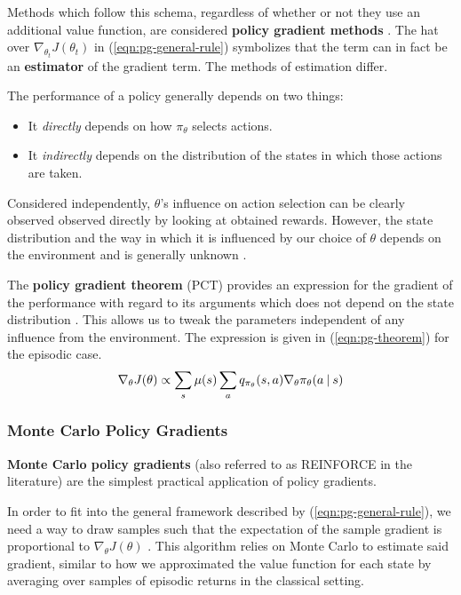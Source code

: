 Methods which follow this schema, regardless of whether or not they use an additional value function, are considered \textbf{policy gradient methods} \cite{rlai}.
The hat over $\nabla_{\theta_{t}} J(\theta_{t})$ in (\ref{eqn:pg-general-rule}) symbolizes that the term can in fact be an \textbf{estimator} of the gradient term. The methods of estimation differ.

The performance of a policy generally depends on two things:
\begin{itemize}
    \item It \emph{directly} depends on how $\pi_{\theta}$ selects actions.
    \item It \emph{indirectly} depends on the distribution of the states in which those actions are taken.
\end{itemize}
Considered independently, $\theta$'s influence on action selection can be clearly observed observed directly by looking at obtained rewards.
However, the state distribution and the way in which it is influenced by our choice of $\theta$ depends on the environment and is generally unknown \cite{rlai}.

The \textbf{policy gradient theorem} (PCT) provides an expression for the gradient of the performance with regard to its arguments which does not depend on the state distribution \cite{rlai}.
This allows us to tweak the parameters independent of any influence from the environment.
The expression is given in (\ref{eqn:pg-theorem}) for the episodic case.
\begin{equation} \label{eqn:pg-theorem}
    \nabla_{\theta} J(\theta) \propto
        \sum_{s}{
            \mu(s) \sum_{a}{
                q_{\pi_{\theta}}(s, a) \nabla_{\theta} \pi_{\theta}(a \:\vert\: s)
            }
        }
\end{equation}

\subsubsection{Monte Carlo Policy Gradients}
\textbf{Monte Carlo policy gradients} (also referred to as REINFORCE in the literature) are the simplest practical application of policy gradients.

In order to fit into the general framework described by (\ref{eqn:pg-general-rule}), we need a way to draw samples such that the expectation of the sample gradient is proportional to $\nabla_{\theta} J(\theta)$ \cite{rlai}.
This algorithm relies on Monte Carlo to estimate said gradient, similar to how we approximated the value function for each state by averaging over samples of episodic returns in the classical setting.

